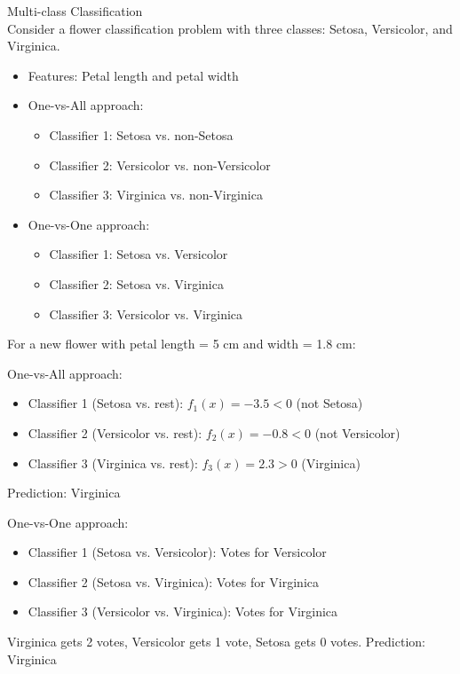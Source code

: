 \begin{example2}{Multi-class Classification}\\
Consider a flower classification problem with three classes: Setosa, Versicolor, and Virginica.
\begin{itemize}
    \item Features: Petal length and petal width
    \item One-vs-All approach:
    \begin{itemize}
        \item Classifier 1: Setosa vs. non-Setosa
        \item Classifier 2: Versicolor vs. non-Versicolor
        \item Classifier 3: Virginica vs. non-Virginica
    \end{itemize}
    \item One-vs-One approach:
    \begin{itemize}
        \item Classifier 1: Setosa vs. Versicolor
        \item Classifier 2: Setosa vs. Virginica
        \item Classifier 3: Versicolor vs. Virginica
    \end{itemize}
\end{itemize}
\tcblower
For a new flower with petal length = 5 cm and width = 1.8 cm:

One-vs-All approach:
\begin{itemize}
    \item Classifier 1 (Setosa vs. rest): $f_1(x) = -3.5 < 0$ (not Setosa)
    \item Classifier 2 (Versicolor vs. rest): $f_2(x) = -0.8 < 0$ (not Versicolor)
    \item Classifier 3 (Virginica vs. rest): $f_3(x) = 2.3 > 0$ (Virginica)
\end{itemize}
Prediction: Virginica

One-vs-One approach:
\begin{itemize}
    \item Classifier 1 (Setosa vs. Versicolor): Votes for Versicolor
    \item Classifier 2 (Setosa vs. Virginica): Votes for Virginica
    \item Classifier 3 (Versicolor vs. Virginica): Votes for Virginica
\end{itemize}
Virginica gets 2 votes, Versicolor gets 1 vote, Setosa gets 0 votes.
Prediction: Virginica
\end{example2}

